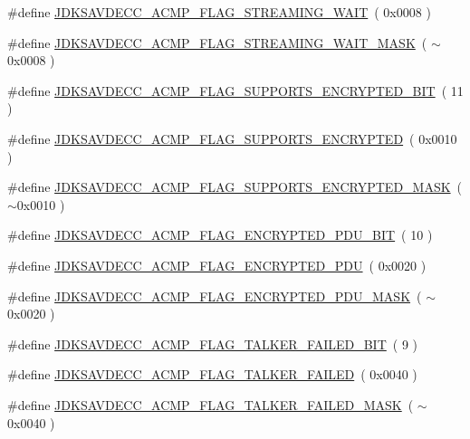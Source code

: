 \begin{DoxyCompactItemize}
\item 
\#define \hyperlink{group__acmp__flag_gac2ff579a48dc141c8d4c578f8e015601}{J\+D\+K\+S\+A\+V\+D\+E\+C\+C\+\_\+\+A\+C\+M\+P\+\_\+\+F\+L\+A\+G\+\_\+\+S\+T\+R\+E\+A\+M\+I\+N\+G\+\_\+\+W\+A\+IT}~( 0x0008 )
\item 
\#define \hyperlink{group__acmp__flag_ga97692ce22f0c80dd4948a11871c76e26}{J\+D\+K\+S\+A\+V\+D\+E\+C\+C\+\_\+\+A\+C\+M\+P\+\_\+\+F\+L\+A\+G\+\_\+\+S\+T\+R\+E\+A\+M\+I\+N\+G\+\_\+\+W\+A\+I\+T\+\_\+\+M\+A\+SK}~( $\sim$0x0008 )
\item 
\#define \hyperlink{group__acmp__flag_ga3b992e17a49e7d5c3ec63f02edbd42d9}{J\+D\+K\+S\+A\+V\+D\+E\+C\+C\+\_\+\+A\+C\+M\+P\+\_\+\+F\+L\+A\+G\+\_\+\+S\+U\+P\+P\+O\+R\+T\+S\+\_\+\+E\+N\+C\+R\+Y\+P\+T\+E\+D\+\_\+\+B\+IT}~( 11 )
\item 
\#define \hyperlink{group__acmp__flag_ga7db4f759d8afb1e40ae426bfeacd612d}{J\+D\+K\+S\+A\+V\+D\+E\+C\+C\+\_\+\+A\+C\+M\+P\+\_\+\+F\+L\+A\+G\+\_\+\+S\+U\+P\+P\+O\+R\+T\+S\+\_\+\+E\+N\+C\+R\+Y\+P\+T\+ED}~( 0x0010 )
\item 
\#define \hyperlink{group__acmp__flag_ga1439c9c607461e1018e129cc4db58bdc}{J\+D\+K\+S\+A\+V\+D\+E\+C\+C\+\_\+\+A\+C\+M\+P\+\_\+\+F\+L\+A\+G\+\_\+\+S\+U\+P\+P\+O\+R\+T\+S\+\_\+\+E\+N\+C\+R\+Y\+P\+T\+E\+D\+\_\+\+M\+A\+SK}~( $\sim$0x0010 )
\item 
\#define \hyperlink{group__acmp__flag_gaf5692b0479f16bc2fe8f5c2da096fccf}{J\+D\+K\+S\+A\+V\+D\+E\+C\+C\+\_\+\+A\+C\+M\+P\+\_\+\+F\+L\+A\+G\+\_\+\+E\+N\+C\+R\+Y\+P\+T\+E\+D\+\_\+\+P\+D\+U\+\_\+\+B\+IT}~( 10 )
\item 
\#define \hyperlink{group__acmp__flag_ga7b5d97dc6a2aae7ea9d72f635c84ee2b}{J\+D\+K\+S\+A\+V\+D\+E\+C\+C\+\_\+\+A\+C\+M\+P\+\_\+\+F\+L\+A\+G\+\_\+\+E\+N\+C\+R\+Y\+P\+T\+E\+D\+\_\+\+P\+DU}~( 0x0020 )
\item 
\#define \hyperlink{group__acmp__flag_ga447c7ff98d5de52a8690615bc45da0d4}{J\+D\+K\+S\+A\+V\+D\+E\+C\+C\+\_\+\+A\+C\+M\+P\+\_\+\+F\+L\+A\+G\+\_\+\+E\+N\+C\+R\+Y\+P\+T\+E\+D\+\_\+\+P\+D\+U\+\_\+\+M\+A\+SK}~( $\sim$0x0020 )
\item 
\#define \hyperlink{group__acmp__flag_gaf862b74aebf1d23fc951c757277be5f6}{J\+D\+K\+S\+A\+V\+D\+E\+C\+C\+\_\+\+A\+C\+M\+P\+\_\+\+F\+L\+A\+G\+\_\+\+T\+A\+L\+K\+E\+R\+\_\+\+F\+A\+I\+L\+E\+D\+\_\+\+B\+IT}~( 9 )
\item 
\#define \hyperlink{group__acmp__flag_gae50d5e48c2113eacba6310d14a2e5915}{J\+D\+K\+S\+A\+V\+D\+E\+C\+C\+\_\+\+A\+C\+M\+P\+\_\+\+F\+L\+A\+G\+\_\+\+T\+A\+L\+K\+E\+R\+\_\+\+F\+A\+I\+L\+ED}~( 0x0040 )
\item 
\#define \hyperlink{group__acmp__flag_gae09eca2bb630852239f4919db286ad93}{J\+D\+K\+S\+A\+V\+D\+E\+C\+C\+\_\+\+A\+C\+M\+P\+\_\+\+F\+L\+A\+G\+\_\+\+T\+A\+L\+K\+E\+R\+\_\+\+F\+A\+I\+L\+E\+D\+\_\+\+M\+A\+SK}~( $\sim$0x0040 )
\end{DoxyCompactItemize}


